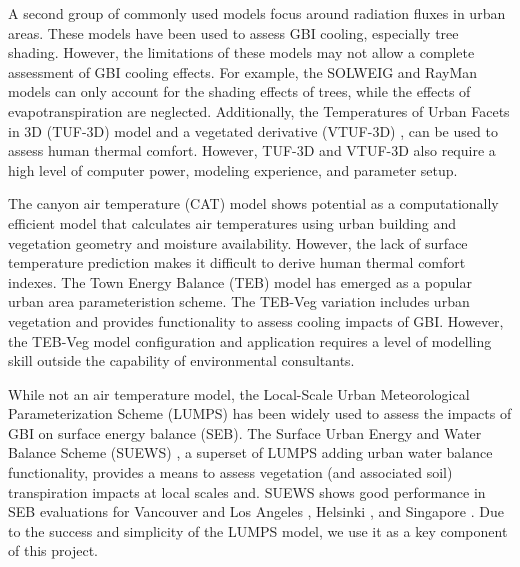\documentclass[gmd, manuscript]{copernicus}
\begin{document}
A second group of commonly used models focus around radiation fluxes in urban areas. These models have been used to assess GBI cooling, especially tree shading. However, the limitations of these models may not allow a complete assessment of GBI cooling effects. For example, the SOLWEIG \citep{Lindberg2008a} and RayMan \citep{Matzarakis2007,Matzarakis2010} models can only account for the shading effects of trees, while the effects of evapotranspiration are neglected. Additionally, the Temperatures of Urban Facets in 3D (TUF-3D) model \citep{Krayenhoff2007b} and a vegetated derivative (VTUF-3D) \citep{nice2018}, can be used to assess human thermal comfort. However, TUF-3D and VTUF-3D also require a high level of computer power, modeling experience, and parameter setup.  

The canyon air temperature (CAT) model \citep{Erell2006} shows potential as a computationally efficient model that calculates air temperatures using urban building and vegetation geometry and moisture availability. However, the lack of surface temperature prediction makes it difficult to derive human thermal comfort indexes. The Town Energy Balance (TEB) model \citep{Masson2000} has emerged as a popular urban area parameteristion scheme. The TEB-Veg \citep{Lemonsu2012,redon2017} variation includes  urban vegetation and provides functionality to assess cooling impacts of GBI. However, the TEB-Veg model configuration and application requires a  level of modelling skill outside the capability of environmental  consultants. 

While not an air temperature model, the Local-Scale Urban Meteorological Parameterization Scheme (LUMPS) \citep{Grimmond2002a} has been widely used  to assess the impacts of GBI on surface energy balance (SEB). The Surface Urban Energy and Water Balance Scheme (SUEWS) \citep{Jarvi2011}, a superset of LUMPS adding urban water balance functionality, provides a means to assess vegetation (and associated soil) transpiration impacts at local scales and. SUEWS shows good performance in SEB evaluations for Vancouver and Los Angeles \citep{Jarvi2011}, Helsinki \citep{Jarvi2014a}, and Singapore \citep{demuzere2017impact}. Due to the success and simplicity of the LUMPS model, we use it as a key component of this project.  
\end{document}
